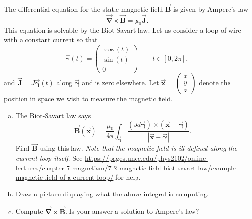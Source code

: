 \documentclass[12pt]{article} %
\newcommand{\grad}{\boldsymbol{\vec{\nabla}}}
\newcommand{\curvegamma}{\boldsymbol{\vec{\gamma}}}
\newcommand{\tangentgamma}{\boldsymbol{\dot{\vec{\gamma}}}}
\newcommand{\vecfieldB}{\boldsymbol{\vec{B}}}
\newcommand{\vecfieldJ}{\boldsymbol{\vec{J}}}
\newcommand{\vecx}{\boldsymbol{\vec{x}}}
\begin{document}
\begin{problem}[BONUS]
The differential equation for the static magnetic field $\vecfieldB$ is given by Ampere's law
\[
\grad \times \vecfieldB = \mu_0 \vecfieldJ.
\]
This equation is solvable by the Biot-Savart law. Let us consider a loop of wire with a constant current so that
\[
\curvegamma(t) = \begin{pmatrix} \cos(t) \\ \sin(t) \\ 0 \end{pmatrix} \qquad t\in [0,2\pi],
\]
and $\vecfieldJ= J \tangentgamma(t)$ along $\curvegamma$ and is zero elsewhere. Let $\vecx = \begin{pmatrix} x \\ y \\ z \end{pmatrix}$ denote the position in space we wish to measure the magnetic field.
\begin{enumerate}[(a)]
    \item The Biot-Savart law says
    \[
    \vecfieldB(\vecx) = \frac{\mu_0}{4\pi} \int_{\curvegamma} \frac{(J d\curvegamma) \times (\vecx - \curvegamma)}{|\vecx-\curvegamma|}.
    \]
    Find $\vecfieldB$ using this law. \emph{Note that the magnetic field is ill defined along the current loop itself.} See \url{https://pages.uncc.edu/phys2102/online-lectures/chapter-7-magnetism/7-2-magnetic-field-biot-savart-law/example-magnetic-field-of-a-current-loop/} for help.
    \item Draw a picture displaying what the above integral is computing.
    \item Compute $\grad \times \vecfieldB$. Is your answer a solution to Ampere's law?
\end{enumerate}
\end{problem}
\end{document}
